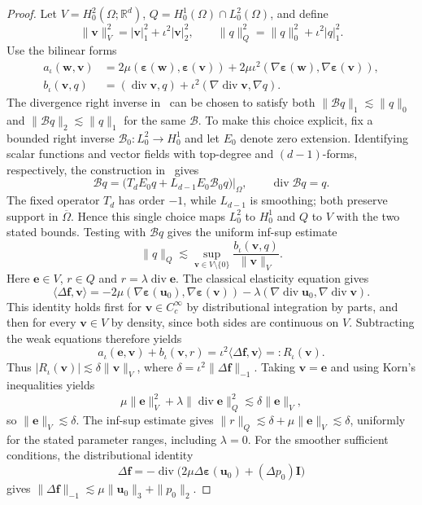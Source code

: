 \documentclass[10pt]{amsart}
\renewcommand{\div}{\operatorname{div}}
\numberwithin{equation}{section}
\begin{document}
\begin{proof}
Let $V=H_0^2(\Omega;\mathbb R^d)$, $Q=H_0^1(\Omega)\cap L_0^2(\Omega)$, and define
\[
\|\boldsymbol v\|_V^2=|\boldsymbol v|_1^2+\iota^2|\boldsymbol v|_2^2,
\qquad\|q\|_Q^2=\|q\|_0^2+\iota^2|q|_1^2.
\]
Use the bilinear forms
\begin{align*}
a_\iota(\boldsymbol w,\boldsymbol v)&=2\mu(\boldsymbol\varepsilon(\boldsymbol w),\boldsymbol\varepsilon(\boldsymbol v))
+2\mu\iota^2(\nabla\boldsymbol\varepsilon(\boldsymbol w),\nabla\boldsymbol\varepsilon(\boldsymbol v)),\\
b_\iota(\boldsymbol v,q)&=(\div\boldsymbol v,q)+\iota^2(\nabla\div\boldsymbol v,\nabla q).
\end{align*}
The divergence right inverse in~\cite[Theorem~1.1]{CostabelMcIntosh2010} can be chosen to satisfy both $\|\mathcal Bq\|_1\lesssim\|q\|_0$ and $\|\mathcal Bq\|_2\lesssim\|q\|_1$ for the same $\mathcal B$. To make this choice explicit, fix a bounded right inverse $\mathcal B_0:L_0^2\to H_0^1$ and let $E_0$ denote zero extension. Identifying scalar functions and vector fields with top-degree and $(d-1)$-forms, respectively, the construction in~\cite[Theorem~4.6 and proof of Corollary~4.7(b)]{CostabelMcIntosh2010} gives
\[
\mathcal Bq=\big(T_dE_0q+L_{d-1}E_0\mathcal B_0q\big)|_\Omega,
\qquad\div\mathcal Bq=q.
\]
The fixed operator $T_d$ has order $-1$, while $L_{d-1}$ is smoothing; both preserve support in $\overline\Omega$. Hence this single choice maps $L_0^2$ to $H_0^1$ and $Q$ to $V$ with the two stated bounds. Testing with $\mathcal Bq$ gives the uniform inf-sup estimate
\[
\|q\|_Q\lesssim\sup_{\boldsymbol v\in V\setminus\{0\}}\frac{b_\iota(\boldsymbol v,q)}{\|\boldsymbol v\|_V}.
\]
Here $\boldsymbol e\in V$, $r\in Q$ and $r=\lambda\div\boldsymbol e$. The classical elasticity equation gives
\[
\langle\Delta\boldsymbol f,\boldsymbol v\rangle
=-2\mu(\nabla\boldsymbol\varepsilon(\boldsymbol u_0),\nabla\boldsymbol\varepsilon(\boldsymbol v))
-\lambda(\nabla\div\boldsymbol u_0,\nabla\div\boldsymbol v).
\]
This identity holds first for $\boldsymbol v\in C_c^\infty$ by distributional integration by parts, and then for every $\boldsymbol v\in V$ by density, since both sides are continuous on $V$. Subtracting the weak equations therefore yields
\[
a_\iota(\boldsymbol e,\boldsymbol v)+b_\iota(\boldsymbol v,r)
=\iota^2\langle\Delta\boldsymbol f,\boldsymbol v\rangle=:R_\iota(\boldsymbol v).
\]
Thus $|R_\iota(\boldsymbol v)|\lesssim\delta\|\boldsymbol v\|_V$, where $\delta=\iota^2\|\Delta\boldsymbol f\|_{-1}$. Taking $\boldsymbol v=\boldsymbol e$ and using Korn's inequalities yields
\[
\mu\|\boldsymbol e\|_V^2+\lambda\|\div\boldsymbol e\|_Q^2\lesssim\delta\|\boldsymbol e\|_V,
\]
so $\|\boldsymbol e\|_V\lesssim\delta$. The inf-sup estimate gives $\|r\|_Q\lesssim\delta+\mu\|\boldsymbol e\|_V\lesssim\delta$, uniformly for the stated parameter ranges, including $\lambda=0$.
For the smoother sufficient conditions, the distributional identity
\[
\Delta\boldsymbol f=-\div\big(2\mu\Delta\boldsymbol\varepsilon(\boldsymbol u_0)+(\Delta p_0)\boldsymbol I\big)
\]
gives $\|\Delta\boldsymbol f\|_{-1}\lesssim\mu\|\boldsymbol u_0\|_3+\|p_0\|_2$.
\end{proof}
\end{document}
